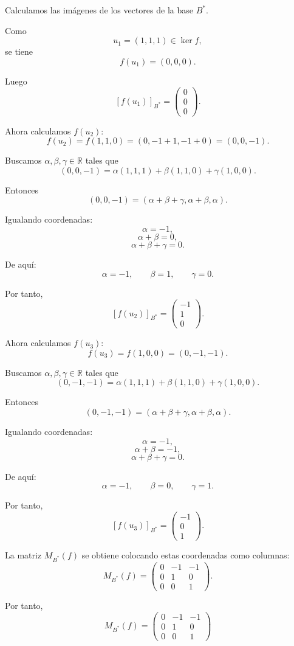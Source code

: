 \documentclass[12pt]{article}
\begin{document}
Calculamos las imágenes de los vectores de la base \(B^*\).

Como
\[
u_1=(1,1,1)\in \ker f,
\]
se tiene
\[
f(u_1)=(0,0,0).
\]

Luego
\[
[f(u_1)]_{B^*}=
\begin{pmatrix}
0\\
0\\
0
\end{pmatrix}.
\]

Ahora calculamos \(f(u_2)\):
\[
f(u_2)=f(1,1,0)=(0,-1+1,-1+0)=(0,0,-1).
\]

Buscamos \(\alpha,\beta,\gamma\in\mathbb{R}\) tales que
\[
(0,0,-1)=\alpha(1,1,1)+\beta(1,1,0)+\gamma(1,0,0).
\]

Entonces
\[
(0,0,-1)=(\alpha+\beta+\gamma,\alpha+\beta,\alpha).
\]

Igualando coordenadas:
\[
\alpha=-1,
\]
\[
\alpha+\beta=0,
\]
\[
\alpha+\beta+\gamma=0.
\]

De aquí:
\[
\alpha=-1,\qquad \beta=1,\qquad \gamma=0.
\]

Por tanto,
\[
[f(u_2)]_{B^*}=
\begin{pmatrix}
-1\\
1\\
0
\end{pmatrix}.
\]

Ahora calculamos \(f(u_3)\):
\[
f(u_3)=f(1,0,0)=(0,-1,-1).
\]

Buscamos \(\alpha,\beta,\gamma\in\mathbb{R}\) tales que
\[
(0,-1,-1)=\alpha(1,1,1)+\beta(1,1,0)+\gamma(1,0,0).
\]

Entonces
\[
(0,-1,-1)=(\alpha+\beta+\gamma,\alpha+\beta,\alpha).
\]

Igualando coordenadas:
\[
\alpha=-1,
\]
\[
\alpha+\beta=-1,
\]
\[
\alpha+\beta+\gamma=0.
\]

De aquí:
\[
\alpha=-1,\qquad \beta=0,\qquad \gamma=1.
\]

Por tanto,
\[
[f(u_3)]_{B^*}=
\begin{pmatrix}
-1\\
0\\
1
\end{pmatrix}.
\]

La matriz \(M_{B^*}(f)\) se obtiene colocando estas coordenadas como columnas:
\[
M_{B^*}(f)=
\begin{pmatrix}
0&-1&-1\\
0&1&0\\
0&0&1
\end{pmatrix}.
\]

Por tanto,
\[
\boxed{
M_{B^*}(f)=
\begin{pmatrix}
0&-1&-1\\
0&1&0\\
0&0&1
\end{pmatrix}
}
\]
\end{document}
